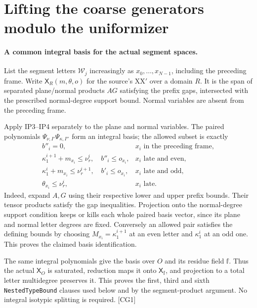 \section{Lifting the coarse generators modulo the uniformizer}
\label{sec:coarse-lift}


\paragraph{A common integral basis for the actual segment spaces.}
List the segment letters $\mathcal W_j$ increasingly as $x_0,\ldots,x_{N-1}$, including
the preceding frame. Write $\mathsf X_R(m,\theta,o)$ for the source's
$\mathrm{XX}'$ over a domain $R$. It is the span of separated plane/normal
products $AG$ satisfying the prefix gaps, intersected with the prescribed
normal-degree support bound. Normal variables are absent from the
preceding frame.

Apply IP3--IP4 separately to the plane and normal variables. The paired
polynomials $\Psi_{\nu,I'}\Psi_{\kappa,I''}$ form an integral basis;
the allowed subset is exactly
\[
\begin{array}{ll}
 b''_i=0,&x_i\text{ in the preceding frame},\\
 \kappa^{i+1}_1+m_{x_i}\le\nu^i_r,\quad b''_i\le o_{x_i},
       &x_i\text{ late and even},\\
 \kappa^i_1+m_{x_i}\le\nu^{i+1}_r,\quad b'_i\le o_{x_i},
       &x_i\text{ late and odd},\\
 \theta_{x_i}\le\nu^i_r,&x_i\text{ late}.
\end{array}                                                    \tag{CG.1}
\]
Indeed, expand $A,G$ using their respective lower and upper prefix
bounds. Their tensor products satisfy the gap inequalities. Projection
onto the normal-degree support condition keeps or kills each whole
paired basis vector, since its plane and normal letter degrees are fixed.
Conversely an allowed pair satisfies the defining bounds by choosing
$M_{x_i}=\kappa^{i+1}_1$ at an even letter and $\kappa^i_1$ at an odd one.
This proves the claimed basis identification.

The same integral polynomials give the basis over $O$ and its residue
field $\mathbb f$. Thus the actual $\mathsf X_O$ is saturated, reduction
maps it onto $\mathsf X_{\mathbb f}$, and projection to a total letter
multidegree preserves it. This proves the first, third and sixth
\texttt{NestedTypeBound} clauses used below and by the segment-product
argument. No integral isotypic splitting is required. \textsf{[CG1]}

